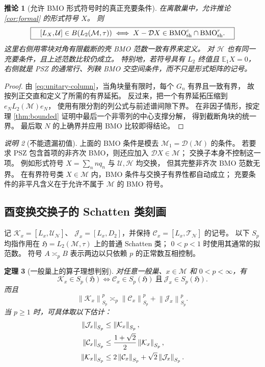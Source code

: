 \documentclass[UTF8,11pt,a4paper,fontset=fandol]{ctexart}
\newtheorem{theorem}{定理}[section]
\newtheorem{corollary}[theorem]{推论}
\theoremstyle{remark}
\newtheorem{remark}[theorem]{说明}
\numberwithin{equation}{section}
\newcommand{\M}{\mathcal M}
\newcommand{\N}{\mathcal N}
\newcommand{\T}{\mathcal T}
\newcommand{\D}{\mathcal D}
\newcommand{\CC}{\mathcal C}
\newcommand{\E}{\mathbb E}
\newcommand{\HH}{\mathfrak H}
\newcommand{\norm}[1]{\left\lVert #1\right\rVert}
\begin{document}
\begin{corollary}[允许 BMO 形式符号时的真正充要条件]\label{cor:unitary-formal}
在离散巢中，允许推论 \ref{cor:formal} 的形式符号 $X$。
则
\[
 \boxed{\quad
 [L_X,\mathcal U]\in B(L_2(\M,\tau))
 \iff X-\D X\in\mathrm{BMO}_{\rm sh}^c\cap\mathrm{BMO}_{\rm sh}^r.
 \quad}
\]
这里右侧用零块对角有限截断的壳 BMO 范数一致有界来定义。
对 $\mathcal H$ 也有同一充要条件，且上述范数比较仍成立。
特别地，若符号具有 $L_2$ 终值且 $\E_1X=0$，右侧就是 PSZ 的通常行、列鞅
BMO 交空间条件，而不只是形式矩阵的记号。
\end{corollary}

\begin{proof}
由 \eqref{eq:unitary-column}，当角块量有限时，每个 $G_n$ 有界且一致有界，
故按列正交直和定义了所需的有界延拓。
反过来，把一个有界延拓压缩到 $e_NL_2(\M)e_N$，
使用有限分割的列公式与前述谱间隙下界。
在非因子情形，按定理 \ref{thm:bounded} 证明中最后一个非零列的中心支撑分解，
得到截断角块的统一界。
最后取 $N$ 的上确界并应用 BMO 比较即得结论。
\end{proof}

\begin{remark}[不能遗漏初值]
上面的 BMO 条件是模去 $\M_1=\D(\M)$ 的条件。
若要求 PSZ 包含首项的非齐次 BMO，则还应加入 $\D X\in\M$；
交换子本身不控制这一项。
例如形式符号 $X=\sum_n n q_n$ 与 $\mathcal U,\mathcal H$ 均交换，
但其完整非齐次 BMO 范数无界。
在有界符号类 $X\in\M$ 内，BMO 条件与交换子有界性都自动成立；
充要条件的非平凡含义在于允许不属于 $\M$ 的 BMO 符号。
\end{remark}

\subsection{酉变换交换子的 Schatten 类刻画}

记 $\mathcal K_x=[L_x,\mathcal U_\N]$、
$\mathcal J_x=[L_x,D_2]$，并保持 $\CC_x=[L_x,\T_\N]$ 的记号。
以下 $S_p$ 均指作用在 $\HH=L_2(\M,\tau)$ 上的普通 Schatten 类；
$0<p<1$ 时使用其通常的拟范数。
符号 $A\asymp_p B$ 表示两边以只依赖 $p$ 的正常数互相控制。

\begin{theorem}[一般巢上的算子理想判别]\label{thm:unitary-ideal}
对任意一般巢、$x\in\M$ 和 $0<p<\infty$，有
\begin{equation}\label{eq:unitary-ideal-iff}
 \boxed{\quad
 \mathcal K_x\in S_p(\HH)
 \iff \CC_x\in S_p(\HH)\ \text{且}\ \mathcal J_x\in S_p(\HH).
 \quad}
\end{equation}
而且
\begin{equation}\label{eq:unitary-ideal-norm}
 \norm{\mathcal K_x}_{S_p}^p
 \asymp_p \norm{\CC_x}_{S_p}^p+\norm{\mathcal J_x}_{S_p}^p.
\end{equation}
当 $p\geq1$ 时，可具体取以下估计：
\begin{align}
 \norm{\mathcal J_x}_{S_p}&\leq\norm{\mathcal K_x}_{S_p},\notag\\
 \norm{\CC_x}_{S_p}&\leq\frac{1+\sqrt2}{2}\norm{\mathcal K_x}_{S_p},\notag\\
 \norm{\mathcal K_x}_{S_p}
 &\leq2\norm{\CC_x}_{S_p}+\sqrt2\norm{\mathcal J_x}_{S_p}.
 \label{eq:unitary-ideal-bounds}
\end{align}
\end{theorem}
\end{document}
